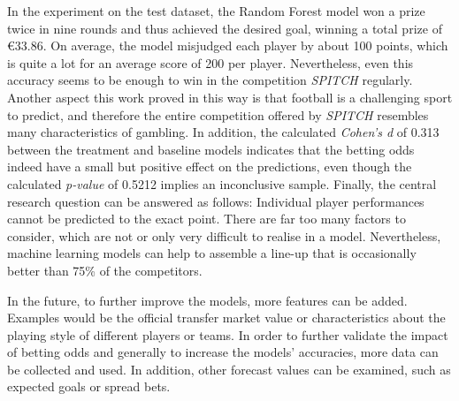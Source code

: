 In the experiment on the test dataset, the Random Forest model won a prize twice in nine rounds and thus achieved the desired goal, winning a total prize of €33.86. On average, the model misjudged each player by about 100 points, which is quite a lot for an average score of 200 per player. Nevertheless, even this accuracy seems to be enough to win in the competition \emph{SPITCH} regularly. Another aspect this work proved in this way is that football is a challenging sport to predict, and therefore the entire competition offered by \emph{SPITCH} resembles many characteristics of gambling. In addition, the calculated \emph{Cohen's d} of 0.313 between the treatment and baseline models indicates that the betting odds indeed have a small but positive effect on the predictions, even though the calculated \emph{p-value} of 0.5212 implies an inconclusive sample. Finally, the central research question can be answered as follows: Individual player performances cannot be predicted to the exact point. There are far too many factors to consider, which are not or only very difficult to realise in a model. Nevertheless, machine learning models can help to assemble a line-up that is occasionally better than 75\% of the competitors.

In the future, to further improve the models, more features can be added. Examples would be the official transfer market value or characteristics about the playing style of different players or teams. In order to further validate the impact of betting odds and generally to increase the models' accuracies, more data can be collected and used. In addition, other forecast values can be examined, such as expected goals or spread bets.